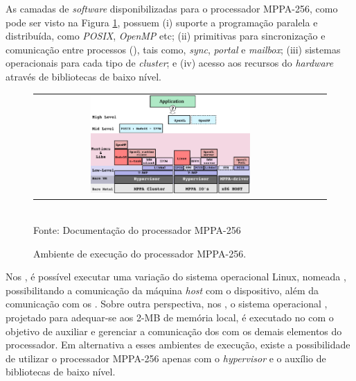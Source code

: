 \documentclass[
	12pt,				%
	openright,			%
	twoside,			%
	a4paper,			%
	english,			%
	brazil,				%
	]{abntex2}
\begin{document}
        As camadas de \textit{software} disponibilizadas para o processador MPPA-256,
        como pode ser visto na Figura \ref{figruntime}, possuem
        (i) suporte a programação paralela e distribuída, como
        \textit{POSIX}, \textit{OpenMP} etc;
        (ii) primitivas para sincronização e comunicação entre processos
        (\ipc), tais como, \textit{sync}, \textit{portal} e \textit{mailbox};
        (iii) sistemas operacionais para cada tipo de \textit{cluster}; e
        (iv) acesso aos recursos do \textit{hardware} através de bibliotecas de baixo nível.

        \begin{figure}[b]
        	\begin{center}
            	\caption{Ambiente de execução do processador MPPA-256.}
                   \label{figruntime}
        		\begin{tabular}{ccc}
        			\includegraphics[width=0.6\textwidth]{figs/software_stack.png} \\
        		\end{tabular}
                \vspace{1ex} \\
                Fonte: Documentação do processador MPPA-256
            \end{center}
           \vspace{-2ex}
        \end{figure}

        Nos \ioclusters, é possível executar uma variação do sistema
        operacional Linux, nomeada \rtems, possibilitando a comunicação da
        máquina \textit{host} com o dispositivo, além da comunicação
        com os \cpclusters.
        Sobre outra perspectiva, nos \cpclusters, o sistema operacional
        \nodeos, projetado para adequar-se aos 2-MB de memória local, é executado 
        no \rman com o objetivo de auxiliar e gerenciar a comunicação dos \pes
        com os demais elementos do processador.
        Em alternativa a esses ambientes de execução, existe a possibilidade
        de utilizar o processador MPPA-256 apenas com o \textit{hypervisor} 
        e o auxílio de bibliotecas de baixo nível.
        
\end{document}
